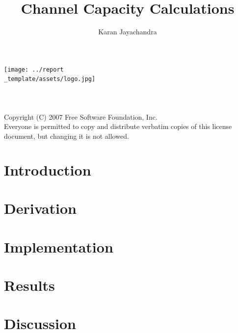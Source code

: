 \documentclass[12pt]{article}
\title{Channel Capacity Calculations}
\author{Karan Jayachandra}
\affil{Personal Archive}
\begin{document}

\makeatletter
    \begin{titlepage}
        \begin{center}
            \texttt{[image: ../report\\\_template/assets/logo.jpg]}\\[4ex]
            {\huge \bfseries \@title }\\[2ex]
            {\LARGE \@author}\\[30ex] 
            {\large \@date} \\[8ex]
            {Copyright (C) 2007 Free Software Foundation, Inc. \\ [2ex] Everyone is permitted to copy and distribute verbatim copies
            of this license document, but changing it is not allowed.}
        \end{center}
    \end{titlepage}
\makeatother
\thispagestyle{empty}
\newpage

\setcounter{page}{1}

\thispagestyle{fancy}

\section{Introduction}
\label{introduce}


\section{Derivation}
\label{derive}


\section{Implementation}
\label{implement}


\section{Results}
\label{results}


\section{Discussion}
\label{discuss}

\end{document}

